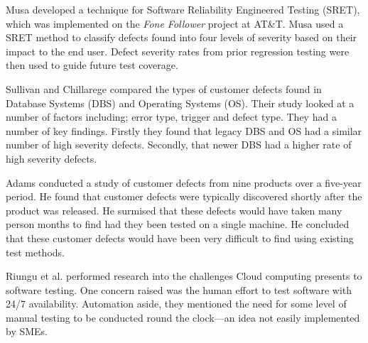 Musa \cite{musa1996software} developed a technique for Software Reliability Engineered Testing (SRET), which was implemented on the \emph{Fone Follower} project at AT\&T. Musa used a SRET method to classify defects found into four levels of severity based on their impact to the end user. Defect severity rates from prior regression testing were then used to guide future test coverage. \par

Sullivan and Chillarege \cite{sullivan1992comparison} compared the types of customer defects found in Database Systems (DBS) and Operating Systems (OS). Their study looked at a number of factors including; error type, trigger and defect type. They had a number of key findings. Firstly they found that legacy DBS and OS had a similar number of high severity defects. Secondly, that newer DBS had a higher rate of high severity defects. \par

Adams \cite{adams1984optimizing} conducted a study of customer defects from nine products over a five-year period. He found that customer defects were typically discovered shortly after the product was released. He surmised that these defects would have taken many person months to find had they been tested on a single machine. He concluded that these customer defects would have been very difficult to find using existing test methods. \par

Riungu et al. \cite{riungu2010research} performed research into the challenges Cloud computing presents to software testing. One concern raised was the human effort to test software with 24/7 availability. Automation aside, they mentioned the need for some level of manual testing to be conducted round the clock---an idea not easily implemented by SMEs.

